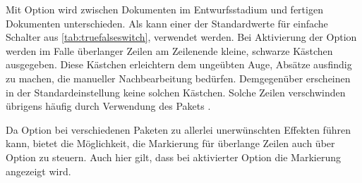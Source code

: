 
\begin{Declaration}
\end{Declaration}%
Mit Option  wird zwischen Dokumenten im Entwurfsstadium und fertigen
Dokumenten unterschieden. Als  kann
einer der Standardwerte für einfache Schalter aus
\autoref{tab:truefalseswitch},  verwendet
werden. Bei Aktivierung der Option werden
im Falle überlanger Zeilen am Zeilenende kleine, schwarze Kästchen
ausgegeben. Diese Kästchen erleichtern dem ungeübten Auge, Absätze ausfindig
zu machen, die manueller Nachbearbeitung bedürfen. Demgegenüber erscheinen in
der Standardeinstellung  keine solchen
Kästchen. Solche Zeilen verschwinden übrigens häufig durch Verwendung des
Pakets
\cite{package:microtype}.

Da Option  bei verschiedenen Paketen zu allerlei unerwünschten
Effekten führen kann, bietet \KOMAScript{} die Möglichkeit, die Markierung für
überlange Zeilen auch über Option
 zu
steuern. Auch hier gilt, dass bei aktivierter Option die Markierung angezeigt
wird.
%
\EndIndexGroup
%
\EndIndexGroup

